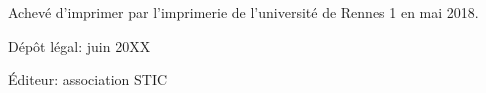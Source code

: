 \documentclass[bw]{sstic}
\begin{document}






\myclearpage
\cleardoublepage
\newpage
{} %
\renewcommand{\indexname}{Index des auteurs}
\printindex







\pagestyle{empty}

\clearpage

\begin{center}
\footnotesize
Achevé d'imprimer par l'imprimerie de l'université de Rennes 1 en mai 2018.

Dépôt légal: juin 20XX

Éditeur: association STIC
\end{center}

\cleardoublepage
\end{document}
